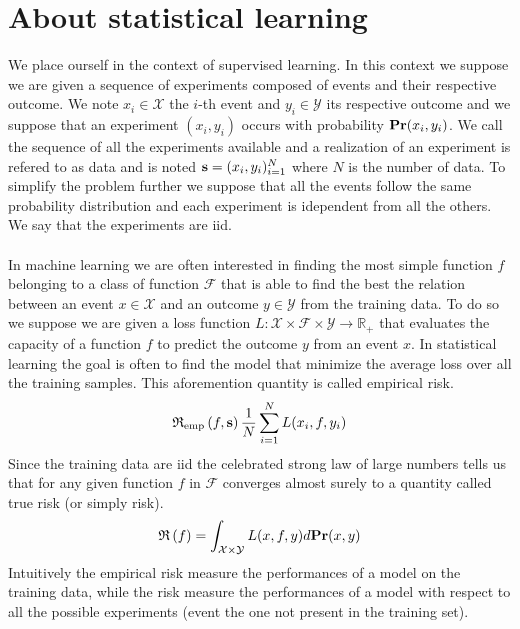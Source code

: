 
\section{About statistical learning}
\label{sec:about_statistical_learning}
We place ourself in the context of supervised learning. In this context we
suppose we are given a sequence of experiments composed of events and their
respective outcome. We note $x_i\in\mathcal{X}$ the $i$-th event and
$y_i\in\mathcal{Y}$ its respective outcome and we suppose that an experiment
$(x_i, y_i)$ occurs with probability ${\mathbf{{Pr}}}(x_i, y_i)$. We call the
sequence of all the experiments available  and a realization
of an experiment is refered to as data and is noted $\boldsymbol{\mathbf{s}}=(x_i,
y_i)_{i=1}^N$ where $N$ is the number of data. To simplify the problem further
we suppose that all the events follow the same probability distribution and
each experiment is idependent from all the others. We say that the experiments
are \acf{iid}.
\paragraph{}
In machine learning we are often interested in finding the most simple function
$f$ belonging to a class of function $\mathcal{F}$ that is able to find the
best the relation between an event $x\in\mathcal{X}$ and an outcome
$y\in\mathcal{Y}$ from the training data. To do so we suppose we are given a
loss function $L:\mathcal{X}\times\mathcal{F}\times\mathcal{Y} \to
\mathbb{R}_+$ that evaluates the capacity of a function $f$ to predict the
outcome $y$ from an event $x$. 
In statistical learning the goal is often to find the model that minimize the
average loss over all the training samples. This aforemention quantity is
called empirical risk.
\begin{dmath*}
    \riskemp{f, \seq{s}} \frac{1}{N}\sum_{i=1}^N L(x_i, f, y_i)
\end{dmath*}
Since the training data are \acs{iid} the celebrated strong law of large
numbers tells us that for any given function $f$ in $\mathcal{F}$ converges
almost surely to a quantity called true risk (or simply risk).
\begin{dmath*}
    \risk{f} = \int_{\mathcal{X}\times\mathcal{Y}} L(x, f, y)
    d\probability(x, y)
\end{dmath*}
Intuitively the empirical risk measure the performances of a model on the
training data, while the risk measure the performances of a model with respect
to all the possible experiments (event the one not present in the training
set).
